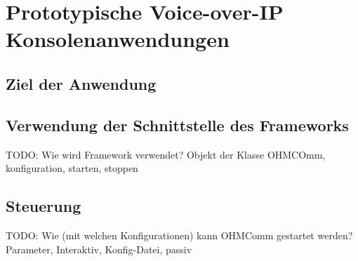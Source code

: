 \chapter{Prototypische Voice-over-IP Konsolenanwendungen}
\label{prototypProgram}
\section{Ziel der Anwendung}
\section{Verwendung der Schnittstelle des Frameworks}
TODO: Wie wird Framework verwendet? Objekt der Klasse OHMCOmm, konfiguration, starten, stoppen
\section{Steuerung}
TODO: Wie (mit welchen Konfigurationen) kann OHMComm gestartet werden? Parameter, Interaktiv, Konfig-Datei, passiv
